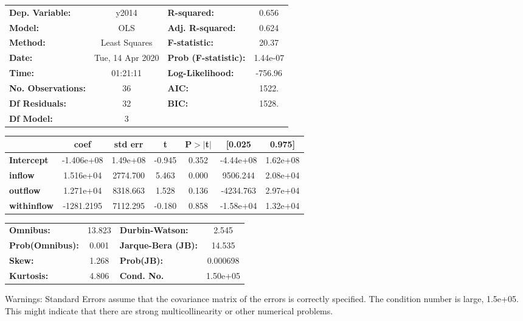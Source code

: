 \begin{center}
\begin{tabular}{lclc}
\toprule
\textbf{Dep. Variable:}    &      y2014       & \textbf{  R-squared:         } &     0.656   \\
\textbf{Model:}            &       OLS        & \textbf{  Adj. R-squared:    } &     0.624   \\
\textbf{Method:}           &  Least Squares   & \textbf{  F-statistic:       } &     20.37   \\
\textbf{Date:}             & Tue, 14 Apr 2020 & \textbf{  Prob (F-statistic):} &  1.44e-07   \\
\textbf{Time:}             &     01:21:11     & \textbf{  Log-Likelihood:    } &   -756.96   \\
\textbf{No. Observations:} &          36      & \textbf{  AIC:               } &     1522.   \\
\textbf{Df Residuals:}     &          32      & \textbf{  BIC:               } &     1528.   \\
\textbf{Df Model:}         &           3      & \textbf{                     } &             \\
\bottomrule
\end{tabular}
\begin{tabular}{lcccccc}
                    & \textbf{coef} & \textbf{std err} & \textbf{t} & \textbf{P$> |$t$|$} & \textbf{[0.025} & \textbf{0.975]}  \\
\midrule
\textbf{Intercept}  &   -1.406e+08  &     1.49e+08     &    -0.945  &         0.352        &    -4.44e+08    &     1.62e+08     \\
\textbf{inflow}     &    1.516e+04  &     2774.700     &     5.463  &         0.000        &     9506.244    &     2.08e+04     \\
\textbf{outflow}    &    1.271e+04  &     8318.663     &     1.528  &         0.136        &    -4234.763    &     2.97e+04     \\
\textbf{withinflow} &   -1281.2195  &     7112.295     &    -0.180  &         0.858        &    -1.58e+04    &     1.32e+04     \\
\bottomrule
\end{tabular}
\begin{tabular}{lclc}
\textbf{Omnibus:}       & 13.823 & \textbf{  Durbin-Watson:     } &    2.545  \\
\textbf{Prob(Omnibus):} &  0.001 & \textbf{  Jarque-Bera (JB):  } &   14.535  \\
\textbf{Skew:}          &  1.268 & \textbf{  Prob(JB):          } & 0.000698  \\
\textbf{Kurtosis:}      &  4.806 & \textbf{  Cond. No.          } & 1.50e+05  \\
\bottomrule
\end{tabular}
\end{center}

Warnings: \newline
 [1] Standard Errors assume that the covariance matrix of the errors is correctly specified. \newline
 [2] The condition number is large, 1.5e+05. This might indicate that there are \newline
 strong multicollinearity or other numerical problems.